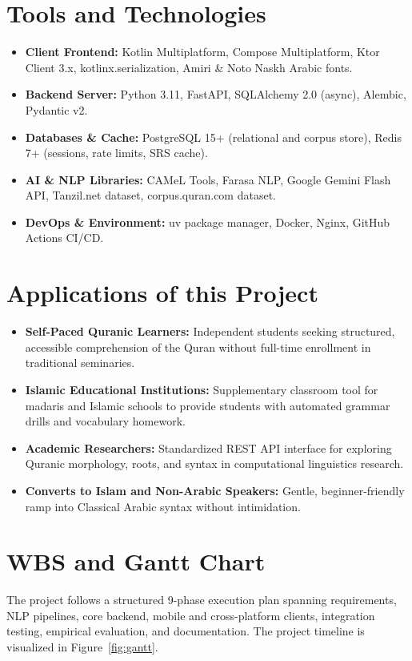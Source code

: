 \documentclass[A4paper,12pt]{article}
\begin{document}
\section{Tools and Technologies}
\begin{itemize}
    \item \textbf{Client Frontend:} Kotlin Multiplatform, Compose Multiplatform, Ktor Client 3.x, kotlinx.serialization, Amiri \& Noto Naskh Arabic fonts.
    \item \textbf{Backend Server:} Python 3.11, FastAPI, SQLAlchemy 2.0 (async), Alembic, Pydantic v2.
    \item \textbf{Databases \& Cache:} PostgreSQL 15+ (relational and corpus store), Redis 7+ (sessions, rate limits, SRS cache).
    \item \textbf{AI \& NLP Libraries:} CAMeL Tools, Farasa NLP, Google Gemini Flash API, Tanzil.net dataset, corpus.quran.com dataset.
    \item \textbf{DevOps \& Environment:} uv package manager, Docker, Nginx, GitHub Actions CI/CD.
\end{itemize}

\section{Applications of this Project}
\begin{itemize}
    \item \textbf{Self-Paced Quranic Learners:} Independent students seeking structured, accessible comprehension of the Quran without full-time enrollment in traditional seminaries.
    \item \textbf{Islamic Educational Institutions:} Supplementary classroom tool for madaris and Islamic schools to provide students with automated grammar drills and vocabulary homework.
    \item \textbf{Academic Researchers:} Standardized REST API interface for exploring Quranic morphology, roots, and syntax in computational linguistics research.
    \item \textbf{Converts to Islam and Non-Arabic Speakers:} Gentle, beginner-friendly ramp into Classical Arabic syntax without intimidation.
\end{itemize}

\section{WBS and Gantt Chart}
The project follows a structured 9-phase execution plan spanning requirements, NLP pipelines, core backend, mobile and cross-platform clients, integration testing, empirical evaluation, and documentation. The project timeline is visualized in Figure~\ref{fig:gantt}.
\end{document}
